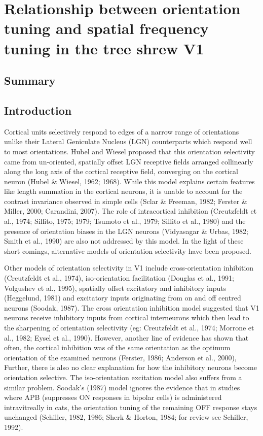 \chapter {Relationship between orientation tuning and spatial frequency tuning in the tree shrew V1}
\pagebreak
\section{Summary}
\pagebreak
\section{Introduction}

Cortical units selectively respond to edges of a narrow range of orientations unlike their Lateral Geniculate Nucleus (LGN) counterparts which respond well to most orientations. Hubel and Wiesel proposed that this orientation selectivity came from un-oriented, spatially offset LGN receptive fields arranged collinearly along the long axis of the cortical receptive field, converging on the cortical neuron (Hubel \& Wiesel, 1962; 1968). While this model explains certain features like length summation in the cortical neurons, it is unable to account for the contrast invariance observed in simple cells (Sclar \& Freeman, 1982; Ferster \& Miller, 2000; Carandini, 2007). The role of intracortical inhibition (Creutzfeldt et al., 1974; Sillito, 1975; 1979; Tsumoto et al., 1979; Sillito et al., 1980) and the presence of orientation biases in the LGN neurons (Vidyasagar \& Urbas, 1982; Smith et al., 1990) are also not addressed by this model. In the light of these short comings, alternative models of orientation selectivity have been proposed.

Other models of orientation selectivity in V1 include cross-orientation inhibition (Creutzfeldt et al., 1974), iso-orientation facilitation (Douglas et al., 1991; Volgushev et al., 1995), spatially offset excitatory and inhibitory inputs (Heggelund, 1981) and excitatory inputs originating from on and off centred neurons (Soodak, 1987).  The cross orientation inhibition model suggested that V1 neurons receive inhibitory inputs from cortical interneurons which then lead to the sharpening of orientation selectivity (eg: Creutzfeldt et al., 1974; Morrone et al., 1982; Eysel et al., 1990). However, another line of evidence has shown that often, the cortical inhibition was of the same orientation as the optimum orientation of the examined neurons (Ferster, 1986; Anderson et al., 2000), Further, there is also no clear explanation for how the inhibitory neurons become orientation selective. The iso-orientation excitation model also suffers from a similar problem. Soodak’s (1987) model ignores the evidence that in studies where APB (suppresses ON responses in bipolar cells) is administered intravitreally in cats, the orientation tuning of the remaining OFF response stays unchanged (Schiller, 1982, 1986; Sherk \& Horton, 1984; for review see Schiller, 1992). 

